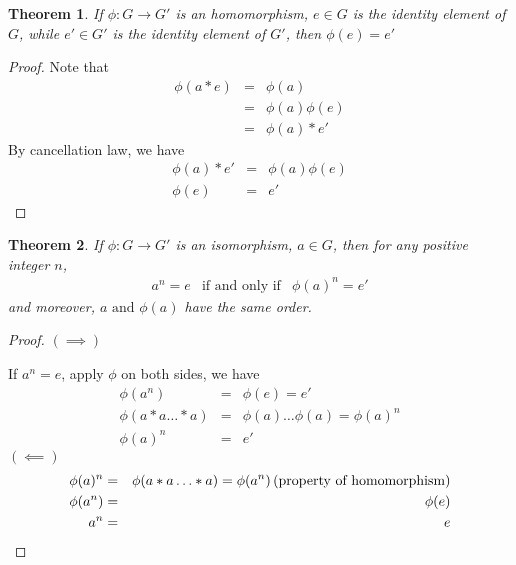 \documentclass{article}
\theoremstyle{MyNonumberplain}
\theoremstyle{break}
\newtheorem*{proof}{Proof. }
\newcommand{\p}{\phi}
\newcommand{\infixand}{\text{ and }}
\newcommand{\tmop}{\text}
\theoremstyle{break}
\newtheorem{theorem}{Theorem}[section]
\theoremstyle{break}
\theoremstyle{definition}
\theoremstyle{break}
\begin{document}
\begin{thmbox}
    \begin{theorem}
        If $\p : G \rightarrow G'$ is an homomorphism, $e \in G$ is the identity
        element of $G$, while $e' \in G'$ is the identity element of $G'$, then $\p
        (e) = e'$
    \end{theorem}
    \begin{prfbox}
        \begin{proof}
            Note that
            \begin{eqnarray*}
            \p (a \ast e) & = & \p (a)\\
            & = & \p (a) \p (e)\\
            & = & \p (a) \ast e'
            \end{eqnarray*}
            By cancellation law, we have
            \begin{eqnarray*}
            \p (a) \ast e' & = & \p (a) \p (e)\\
            \p (e) & = & e'
            \end{eqnarray*}
        \end{proof}
    \end{prfbox}
\end{thmbox}

\begin{thmbox}
    \begin{theorem}
        If $\p : G \rightarrow G'$ is an isomorphism, $a \in G$, then for any
        positive integer $n$,
        \begin{eqnarray*}
        a^n = e & \tmop{if and only if} & \p (a)^n = e'
        \end{eqnarray*}
        and moreover, $a \infixand \p (a)$ have the same order.
    \end{theorem}
    \begin{prfbox}
        \begin{proof}
                $(\implies)$
              
              If $a^n = e$, apply $\p$ on both sides, we have
              \begin{eqnarray*}
                \p (a^n) & = & \p (e) = e'\\
                \p (a \ast a \ldots \ast a) & = & \p (a) \ldots \p (a) = \p (a)^n\\
                \p (a)^n & = & e'
              \end{eqnarray*}
$(\impliedby)$
              \begin{eqnarray*}
                \p (a)^n & = & \p (a \ast a \ldots \ast a) = \p (a^n) \hspace*{\fill} \left(
                \text{property of homomorphism} \right)\\
                \p (a^n) & = & \p (e)\\
                a^n & = & e
              \end{eqnarray*}
        \end{proof}
    \end{prfbox}
\end{thmbox}
\end{document}
